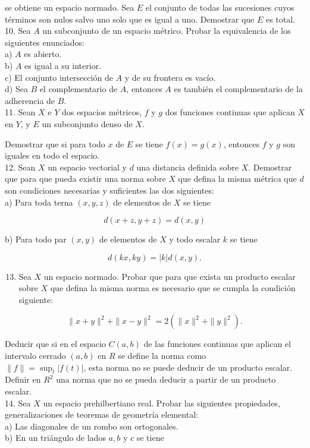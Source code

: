 \documentclass[10pt]{article}
\theoremstyle{plain}
\theoremstyle{definition}
\theoremstyle{remark}
\begin{document}
se obtiene un espacio normado. Sea $E$ el conjunto de todas las sucesiones cuyos términos son nulos salvo uno solo que es igual a uno. Demostrar que $E$ es total.\\
10. Sea $A$ un subconjunto de un espacio métrico. Probar la equivalencia de los siguientes enunciados:\\
a) $A$ es abierto.\\
b) $A$ es igual a su interior.\\
c) El conjunto intersección de $A$ y de su frontera es vacío.\\
d) Sea $B$ el complementario de $A$, entonces $A$ es también el complementario de la adherencia de $B$.\\
11. Sean $X$ e $Y$ dos espacios métricos, $f$ y $g$ dos funciones continuas que aplican $X$ en $Y$, y $E$ un subconjunto denso de $X$.

Demostrar que si para todo $x$ de $E$ se tiene $f(x)=g(x)$, entonces $f$ y $g$ son iguales en todo el espacio.\\
12. Sean $X$ un espacio vectorial y $d$ una distancia definida sobre $X$. Demostrar que para que pueda existir una norma sobre $X$ que defina la misma métrica que $d$ son condiciones necesarias y suficientes las dos siguientes:\\
a) Para toda terna $(x, y, z)$ de elementos de $X$ se tiene

$$
d(x+z, y+z)=d(x, y)
$$

b) Para todo par $(x, y)$ de elementos de $X$ y todo escalar $k$ se tiene

$$
d(k x, k y)=|k| d(x, y) .
$$

\begin{enumerate}
  \setcounter{enumi}{12}
  \item Sea $X$ un espacio normado. Probar que para que exista un producto escalar sobre $X$ que defina la misma norma es necesario que se cumpla la condición siguiente:
\end{enumerate}

$$
\|x+y\|^{2}+\|x-y\|^{2}=2\left(\|x\|^{2}+\|y\|^{2}\right) .
$$

Deducir que si en el espacio $C(a, b)$ de las funciones continuas que aplican el intervalo cerrado $(a, b)$ en $R$ se define la norma como\\
$\|f\|=\sup _{t}|f(t)|$, esta norma no se puede deducir de un producto escalar.\\
Definir en $R^{2}$ una norma que no se pueda deducir a partir de un producto escalar.\\
14. Sea $X$ un espacio prehilbertiano real. Probar las siguientes propiedades, generalizaciones de teoremas de geometría elemental:\\
a) Las diagonales de un rombo son ortogonales.\\
b) En un triángulo de lados $a, b$ y $c$ se tiene
\end{document}
